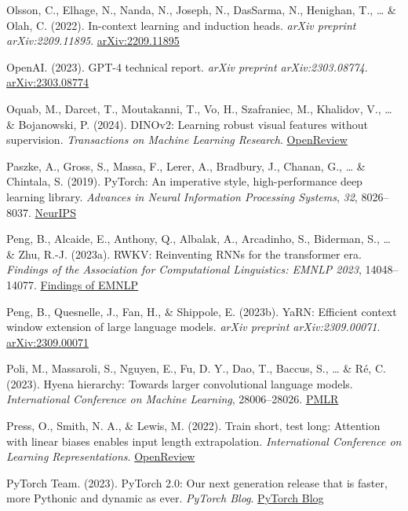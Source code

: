\documentclass[10pt,twocolumn]{article}
\begin{document}
Olsson, C., Elhage, N., Nanda, N., Joseph, N., DasSarma, N., Henighan, T., \ldots{} \& Olah, C. (2022). In-context learning and induction heads. \emph{arXiv preprint arXiv:2209.11895}. \href{https://arxiv.org/abs/2209.11895}{arXiv:2209.11895}

OpenAI. (2023). GPT-4 technical report. \emph{arXiv preprint arXiv:2303.08774}. \href{https://arxiv.org/abs/2303.08774}{arXiv:2303.08774}

Oquab, M., Darcet, T., Moutakanni, T., Vo, H., Szafraniec, M., Khalidov, V., \ldots{} \& Bojanowski, P. (2024). DINOv2: Learning robust visual features without supervision. \emph{Transactions on Machine Learning Research}. \href{https://openreview.net/forum?id=68kgN2O0Ew}{OpenReview}

Paszke, A., Gross, S., Massa, F., Lerer, A., Bradbury, J., Chanan, G., \ldots{} \& Chintala, S. (2019). PyTorch: An imperative style, high-performance deep learning library. \emph{Advances in Neural Information Processing Systems}, \emph{32}, 8026--8037. \href{https://papers.nips.cc/paper_files/paper/2019/hash/bdbca288fee7f92f2bfa9f7012727740-Abstract.html}{NeurIPS}

Peng, B., Alcaide, E., Anthony, Q., Albalak, A., Arcadinho, S., Biderman, S., \ldots{} \& Zhu, R.-J. (2023a). RWKV: Reinventing RNNs for the transformer era. \emph{Findings of the Association for Computational Linguistics: EMNLP 2023}, 14048--14077. \href{https://aclanthology.org/2023.findings-emnlp.936}{Findings of EMNLP}

Peng, B., Quesnelle, J., Fan, H., \& Shippole, E. (2023b). YaRN: Efficient context window extension of large language models. \emph{arXiv preprint arXiv:2309.00071}. \href{https://arxiv.org/abs/2309.00071}{arXiv:2309.00071}

Poli, M., Massaroli, S., Nguyen, E., Fu, D. Y., Dao, T., Baccus, S., \ldots{} \& Ré, C. (2023). Hyena hierarchy: Towards larger convolutional language models. \emph{International Conference on Machine Learning}, 28006--28026. \href{https://proceedings.mlr.press/v202/poli23a.html}{PMLR}

Press, O., Smith, N. A., \& Lewis, M. (2022). Train short, test long: Attention with linear biases enables input length extrapolation. \emph{International Conference on Learning Representations}. \href{https://openreview.net/forum?id=R8sQPpGCv0}{OpenReview}

PyTorch Team. (2023). PyTorch 2.0: Our next generation release that is faster, more Pythonic and dynamic as ever. \emph{PyTorch Blog}. \href{https://pytorch.org/blog/pytorch-2.0-release/}{PyTorch Blog}
\end{document}
